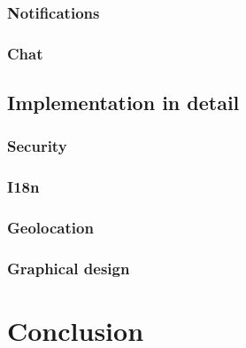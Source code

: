\documentclass[11pt,draft,oneside]{fithesis}
\begin{document}
	\subsection{Notifications}
	\subsection{Chat}
\section{Implementation in detail}
	\subsection{Security}
	\subsection{I18n}
	\subsection{Geolocation}
	\subsection{Graphical design}
\chapter{Conclusion}


\end{document}
